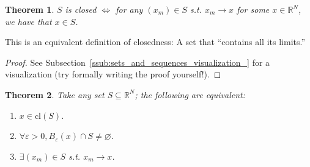 \documentclass{article}
\newcommand{\cl}{\text{cl}}
\newcommand{\R}{\mathbb{R}}
\newtheorem{theorem}{Theorem}
\theoremstyle{definition}
\begin{document}
\begin{theorem}\label{thm:lecture2_closed_sequential}
  $S$ is closed $\iff$ for any $(x_m) \in S$ s.t. $x_m \to x$ for some $x \in \R^N$, we have that $x \in S$.
\end{theorem}
This is an equivalent definition of closedness: A set that ``contains all its limits.''
\begin{proof}
    See Subsection~\ref{ssub:sets_and_sequences_visualization_} for a visualization (try formally writing the proof yourself!).
\end{proof}

\begin{theorem}
  Take any set $S \subseteq \mathbb{R}^N$; the following are equivalent:
  \begin{enumerate}
    \item[a)] $x \in \cl(S)$.
    \item[b)] $\forall \varepsilon > 0, B_{\varepsilon}(x) \cap S \ne \varnothing$.
    \item[c)] $\exists (x_m) \in S$ s.t. $x_m \to x$.
  \end{enumerate}
\end{theorem}
\end{document}
